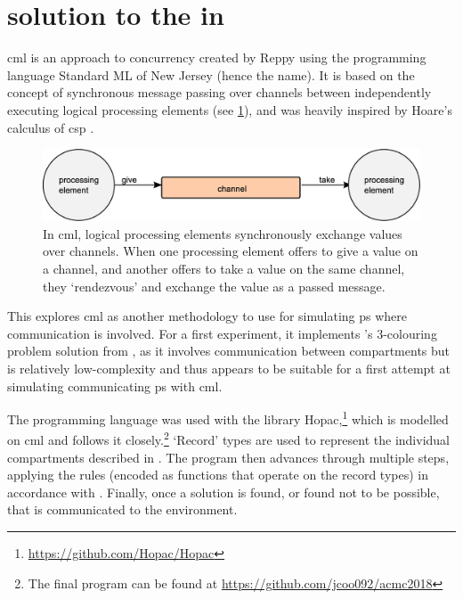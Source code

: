 \section{\label{sec:gcol:cml} solution to the  in }
\Gls{cml} is an approach to concurrency created by Reppy \cite{Reppy1991} using the programming language Standard ML of New Jersey (hence the name).  It is based on the concept of synchronous message passing over channels between independently executing logical processing elements \cite{Panangaden1997} (see \cref{fig:gcol:cml_exchange}), and was heavily inspired by Hoare's calculus of \gls{csp} \cite{Hoare1985}.  

\begin{figure}
    \centering
    \includegraphics[width=\textwidth]{chapters/gcol/figs/cml_exchange.eps}
    \caption[Diagram of the message-passing primitive in ]{In \gls{cml}, logical processing elements synchronously exchange values over channels.  When one processing element offers to give a value on a channel, and another offers to take a value on the same channel, they ‘rendezvous’ and exchange the value as a passed message.}
    \label{fig:gcol:cml_exchange}
\end{figure}


This  explores \gls{cml} as another methodology to use for simulating \gls{ps} where communication is involved.  For a first experiment, it implements \citeauthor{Gheorghe2013}'s 3-colouring problem solution from \cite{Gheorghe2013}, as it involves communication between compartments but is relatively low-complexity and thus appears to be suitable for a first attempt at simulating communicating \gls{ps} with \gls{cml}.

The programming language \fsharp{} was used with the library Hopac,\footnote{\url{https://github.com/Hopac/Hopac}} which is modelled on \gls{cml} and follows it closely.\footnote{The final program can be found at \url{https://github.com/jcoo092/acmc2018}}  `Record' types are used to represent the individual compartments described in \cite{Gheorghe2013}.  The program then advances through multiple steps, applying the rules (encoded as functions that operate on the record types) in accordance with \cite{Gheorghe2013}.  Finally, once a solution is found, or found not to be possible, that is communicated to the environment.

